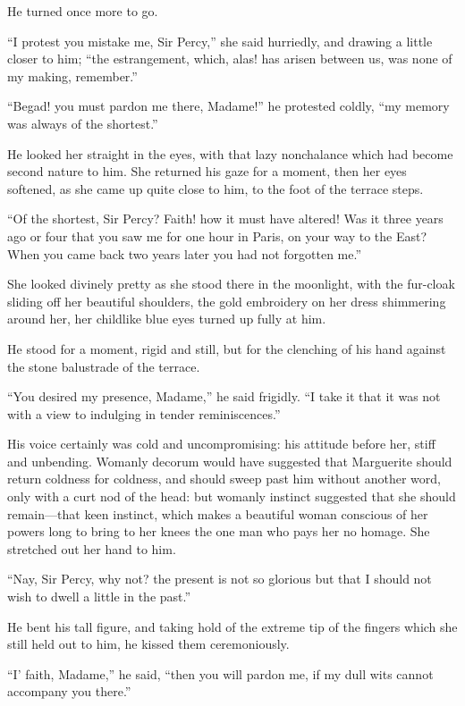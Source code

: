 \documentclass[paper=5.5in:8.5in,BCOR=7mm,twoside,DIV=calc,12pt,usegeometry,chapterprefix,endperiod,headings=big]{scrbook}
\begin{document}
He turned once more to go.

\enquote{I protest you mistake me, Sir Percy,} she said hurriedly, and drawing a little closer to him; \enquote{the estrangement, which, alas! has arisen between us, was none of my making, remember.}

\enquote{Begad! you must pardon me there, Madame!} he protested coldly, \enquote{my memory was always of the shortest.}

He looked her straight in the eyes, with that lazy nonchalance which had become second nature to him. She returned his gaze for a moment, then her eyes softened, as she came up quite close to him, to the foot of the terrace steps.

\enquote{Of the shortest, Sir Percy? Faith! how it must have altered! Was it three years ago or four that you saw me for one hour in Paris, on your way to the East? When you came back two years later you had not forgotten me.}

She looked divinely pretty as she stood there in the moonlight, with the fur-cloak sliding off her beautiful shoulders, the gold embroidery on her dress shimmering around her, her childlike blue eyes turned up fully at him.

He stood for a moment, rigid and still, but for the clenching of his hand against the stone balustrade of the terrace.

\enquote{You desired my presence, Madame,} he said frigidly. \enquote{I take it that it was not with a view to indulging in tender reminiscences.}

His voice certainly was cold and uncompromising: his attitude before her, stiff and unbending. Womanly decorum would have suggested that Marguerite should return coldness for coldness, and should sweep past him without another word, only with a curt nod of the head: but womanly instinct suggested that she should remain---that keen instinct, which makes a beautiful woman conscious of her powers long to bring to her knees the one man who pays her no homage. She stretched out her hand to him.

\enquote{Nay, Sir Percy, why not? the present is not so glorious but that I should not wish to dwell a little in the past.}

He bent his tall figure, and taking hold of the extreme tip of the fingers which she still held out to him, he kissed them ceremoniously.

\enquote{I’ faith, Madame,} he said, \enquote{then you will pardon me, if my dull wits cannot accompany you there.}
\end{document}
